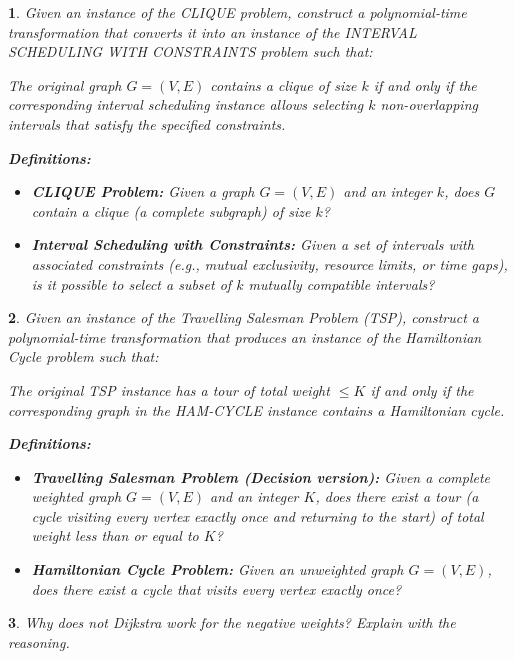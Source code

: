 \documentclass[%
addpoints]{exam}
\theoremstyle{problem}
\newtheorem{p}{}
\begin{document}
\begin{p}

Given an instance of the CLIQUE problem, construct a polynomial-time transformation that converts it into an instance of the INTERVAL SCHEDULING WITH CONSTRAINTS problem such that:

The original graph $G=(V,E)$ contains a clique of size $k$ if and only if the corresponding interval scheduling instance allows selecting $k$ non-overlapping intervals that satisfy the specified constraints.

\textbf{Definitions:}
\begin{itemize}
\item \textbf{CLIQUE Problem:} Given a graph $G=(V,E)$ and an integer $k$, does $G$ contain a clique (a complete subgraph) of size $k$?
\item \textbf{Interval Scheduling with Constraints:} Given a set of intervals with associated constraints (e.g., mutual exclusivity, resource limits, or time gaps), is it possible to select a subset of $k$ mutually compatible intervals?
\end{itemize}
\hfill \end{p}

\begin{p}

Given an instance of the Travelling Salesman Problem (TSP), construct a polynomial-time transformation that produces an instance of the Hamiltonian Cycle problem such that:

The original TSP instance has a tour of total weight $\leq K$ if and only if the corresponding graph in the HAM-CYCLE instance contains a Hamiltonian cycle.

\textbf{Definitions:}
\begin{itemize}
\item \textbf{Travelling Salesman Problem (Decision version):} Given a complete weighted graph $G=(V,E)$ and an integer $K$, does there exist a tour (a cycle visiting every vertex exactly once and returning to the start) of total weight less than or equal to $K$?
\item \textbf{Hamiltonian Cycle Problem:} Given an unweighted graph $G=(V,E)$, does there exist a cycle that visits every vertex exactly once?
\end{itemize}
\hfill \end{p}

\begin{p}
Why does not Dijkstra work for the negative weights? Explain with the reasoning.
\hfill \end{p}
\end{document}
